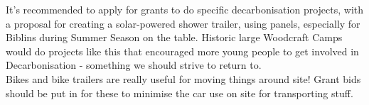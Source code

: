 It's recommended to apply for grants to do specific decarbonisation projects, with a proposal for creating a solar-powered shower trailer, using panels, especially for Biblins during Summer Season on the table. Historic large Woodcraft Camps would do projects like this that encouraged more young people to get involved in Decarbonisation - something we should strive to return to.\\

Bikes and bike trailers are really useful for moving things around site! Grant bids should be put in for these to minimise the car use on site for transporting stuff.
